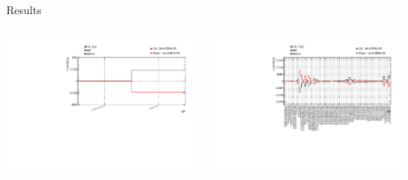 \documentclass[bigger]{beamer}
\begin{document}
\begin{frame}[label={sec:org6c8e211}]{Results}
\begin{columns}
\begin{column}{0.45\columnwidth}
\begin{center}
\includegraphics[width=\linewidth]{./plots/h013_ALL_Systematics_Inclusive_mean_mean.pdf}
\end{center}
\end{column}

\begin{column}{0.45\columnwidth}
\begin{center}
\includegraphics[width=\linewidth]{./plots/h013_FULL_Systematics_Inclusive_mean_mean.pdf}
\end{center}
\end{column}
\end{columns}


\end{frame}
\end{document}
